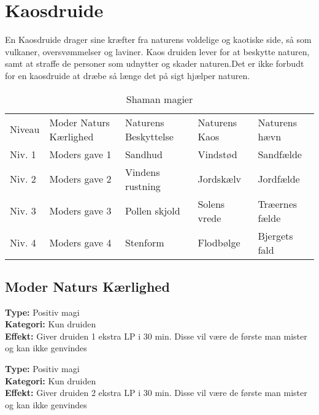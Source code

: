 \chapter*{Kaosdruide}
En Kaosdruide drager sine kræfter fra naturens voldelige og kaotiske side, så som vulkaner, oversvømmelser og laviner. Kaos druiden lever for at beskytte naturen, samt at straffe de personer som udnytter og skader naturen.Det er ikke forbudt for en kaosdruide at dræbe så længe det på sigt hjælper naturen.

\begin{table}[H]
    \centering
    \begin{tabular}{|p{}|p{}|p{}|p{}|p{}|}
    \hline
    \rowcolor{cerulean!80}
    \multicolumn{5}{c}{Kaosdruide magi}\\
    \hline
    \rowcolor{cerulean!40}
         Niveau &Moder Naturs Kærlighed & Naturens Beskyttelse & Naturens Kaos & Naturens hævn \\\hline
        Niv. 1 & Moders gave 1 & Sandhud & Vindstød & Sandfælde\\\hline
        Niv. 2 & Moders gave 2& Vindens rustning & Jordskælv & Jordfælde \\\hline
         Niv. 3 & Moders gave 3 & Pollen skjold & Solens vrede & Træernes fælde \\\hline
         Niv. 4 & Moders gave 4 & Stenform & Flodbølge & Bjergets fald\\\hline
         \end{tabular}
         \caption{Shaman magier}
\end{table}

\section*{Moder Naturs Kærlighed}
\begin{mkær*}
\textbf{Type:} Positiv magi\\
\textbf{Kategori:} Kun druiden\\
\textbf{Effekt:} Giver druiden 1 ekstra LP i 30 min. Disse vil være de første man mister og kan ikke genvindes
\end{mkær*}

\begin{mkær*}
\textbf{Type:} Positiv magi\\ 
\textbf{Kategori:} Kun druiden\\
\textbf{Effekt:} Giver druiden 2 ekstra LP i 30 min. Disse vil være de første man mister og kan ikke genvindes
\end{mkær*}

